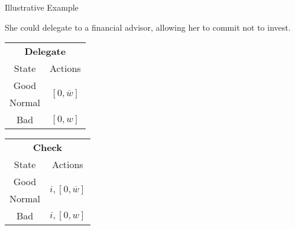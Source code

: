 \documentclass[usenames,dvipsnames,aspectratio=169,11pt, envcountsect, handout]{beamer}
\begin{document}
\begin{frame}[noframenumbering]{Illustrative Example}

	She could delegate to a financial advisor, allowing her to commit not to invest. \pause

	\vfill

	\begin{table}[H]
		\centering
		\begin{minipage}{0.29\textwidth}
			\centering
			\begin{tabular}{c | c}
				\multicolumn{2}{c}{\textbf{Delegate}}                                                     \\
				State                & Actions                                                            \\
				\hline
				{\color{blue}Good}   & \multirow{2}{*}{{\color{blue}\( \left[0, \overline{w} \right] \)}} \\
				{\color{blue}Normal} &                                                                    \\
				Bad                  & \( \left[0, w \right]\)                                            \\
			\end{tabular}
			\vspace{0.5cm} %
		\end{minipage}\hspace{0.5cm} %
		\begin{minipage}{0.29\textwidth}
			\centering
			\begin{tabular}{c | c}
				\multicolumn{2}{c}{\textbf{Check}}                                                            \\
				State                & Actions                                                                \\
				\hline
				{\color{blue}Good}   & \multirow{2}{*}{{\color{blue}\( i, \left[ 0, \overline{w} \right] \)}} \\
				{\color{blue}Normal} &                                                                        \\
				Bad                  & \(  i, \left[0, w \right] \)                                           \\
			\end{tabular}
			\vspace{0.5cm} %

\end{minipage}
\end{table}
\end{frame}
\end{document}
